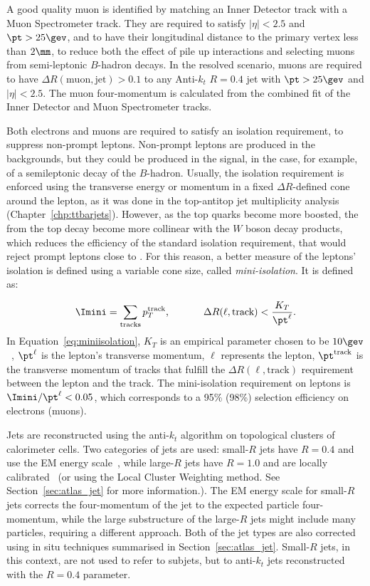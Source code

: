 A good quality muon is identified by matching an Inner Detector track with a Muon Spectrometer track. They are required to satisfy $|\eta| < 2.5$ and $\pt > 25\gev$, and to have
their longitudinal distance to the primary vertex less than $2\mm$, to reduce both the effect of pile up interactions and selecting muons from semi-leptonic $B$-hadron decays.
In the resolved scenario, muons are required to have $\Delta R(\textrm{muon}, \textrm{jet}) > 0.1$ to any Anti-$k_t$
$R=0.4$ jet with $\pt > 25\gev$ and $|\eta| < 2.5$. The muon four-momentum is calculated from the combined fit of the Inner Detector and Muon Spectrometer tracks.

Both electrons and muons are required to satisfy an isolation requirement, to suppress non-prompt leptons. Non-prompt leptons are produced in the backgrounds, but they could
be produced in the signal, in the case, for example, of a semileptonic decay of the $B$-hadron. Usually, the isolation requirement is enforced using the transverse energy
or momentum in a fixed $\Delta R$-defined cone around the lepton, as it was done in the top-antitop jet multiplicity analysis (Chapter~\ref{chp:ttbarjets}).
However, as the top quarks become more boosted, the \bjets from the top decay become more collinear with the $W$ boson decay
products, which reduces the efficiency of the standard isolation requirement, that would reject prompt leptons close to \bjets. For this reason, a better
measure of the leptons' isolation is defined using a variable cone size, called \emph{mini-isolation}. It is defined as:

\begin{equation}
\displaystyle
\Imini = \sum_{\textrm{tracks}} p_{T}^{\textrm{track}} \textrm{, \hspace{1cm} } \Delta R(\ell, \textrm{track}) < \frac{K_T}{\pt^\ell}.
\label{eq:miniisolation}
\end{equation}
In Equation~\ref{eq:miniisolation}, $K_T$ is an empirical parameter chosen to be $10\gev$~\cite{ttres7paper},
$\pt^\ell$ is the lepton's transverse momentum, $\ell$ represents the lepton, $\pt^{\textrm{track}}$
is the transverse momentum of tracks that fulfill the $\Delta R(\ell, \textrm{track})$ requirement between the lepton and the track.
The mini-isolation requirement on leptons is $\Imini/\pt^\ell < 0.05$, which corresponds to a 95\% (98\%) selection efficiency on electrons (muons).

Jets are reconstructed using the anti-$k_t$ algorithm on topological clusters of calorimeter cells. Two categories of jets are used: small-$R$ jets have $R=0.4$ and
use the EM energy scale~\cite{jes2011}, while large-$R$ jets have $R=1.0$ and are locally calibrated~\cite{jes2011,fatjet_confnote} (or using the Local Cluster Weighting method. See Section~\ref{sec:atlas_jet} for more information.).
The EM energy scale for small-$R$ jets corrects the four-momentum of the
jet to the expected particle four-momentum, while the large substructure
of the large-$R$ jets might include many particles, requiring a different
approach. Both of the jet types are also corrected using in situ
techniques summarised in Section~\ref{sec:atlas_jet}. Small-$R$
jets, in this context, are not used to refer to subjets, but to anti-$k_t$
jets reconstructed with the $R=0.4$ parameter.

